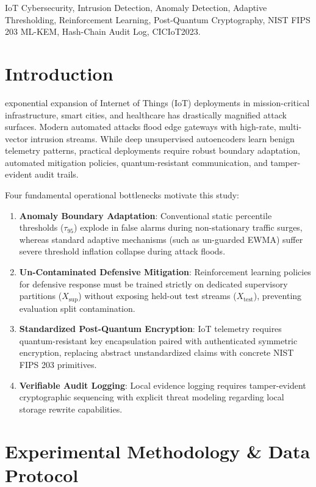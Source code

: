 \documentclass[journal]{IEEEtran}
\begin{document}
\begin{IEEEkeywords}
IoT Cybersecurity, Intrusion Detection, Anomaly Detection, Adaptive Thresholding, Reinforcement Learning, Post-Quantum Cryptography, NIST FIPS 203 ML-KEM, Hash-Chain Audit Log, CICIoT2023.
\end{IEEEkeywords}

\section{Introduction}
 exponential expansion of Internet of Things (IoT) deployments in mission-critical infrastructure, smart cities, and healthcare has drastically magnified attack surfaces. Modern automated attacks flood edge gateways with high-rate, multi-vector intrusion streams. While deep unsupervised autoencoders learn benign telemetry patterns, practical deployments require robust boundary adaptation, automated mitigation policies, quantum-resistant communication, and tamper-evident audit trails.

Four fundamental operational bottlenecks motivate this study:
\begin{enumerate}
    \item \textbf{Anomaly Boundary Adaptation}: Conventional static percentile thresholds ($\tau_{95}$) explode in false alarms during non-stationary traffic surges, whereas standard adaptive mechanisms (such as un-guarded EWMA) suffer severe threshold inflation collapse during attack floods.
    \item \textbf{Un-Contaminated Defensive Mitigation}: Reinforcement learning policies for defensive response must be trained strictly on dedicated supervisory partitions ($X_{\text{sup}}$) without exposing held-out test streams ($X_{\text{test}}$), preventing evaluation split contamination.
    \item \textbf{Standardized Post-Quantum Encryption}: IoT telemetry requires quantum-resistant key encapsulation paired with authenticated symmetric encryption, replacing abstract unstandardized claims with concrete NIST FIPS 203 primitives.
    \item \textbf{Verifiable Audit Logging}: Local evidence logging requires tamper-evident cryptographic sequencing with explicit threat modeling regarding local storage rewrite capabilities.
\end{enumerate}

\section{Experimental Methodology \& Data Protocol}
\end{document}
